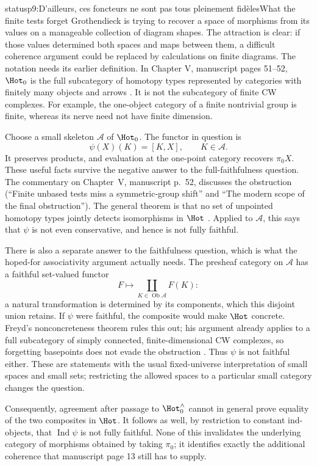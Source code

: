 \begin{dcomment}{status}{p9:D'ailleurs, ces foncteurs ne sont pas tous pleinement fidèles}{What the finite tests forget}
Grothendieck is trying to recover a space of morphisms from its values on a manageable collection of diagram shapes. The attraction is clear: if those values determined both spaces and maps between them, a difficult coherence argument could be replaced by calculations on finite diagrams. The notation needs its earlier definition. In Chapter V, manuscript pages 51--52, $\Hot_0$ is the full subcategory of homotopy types represented by categories with finitely many objects and arrows \citep[Chapter V, printed pp.~31--32]{GrothendieckDerivateursV}. It is not the subcategory of finite CW complexes. For example, the one-object category of a finite nontrivial group is finite, whereas its nerve need not have finite dimension.

Choose a small skeleton $\mathcal A$ of $\Hot_0$. The functor in question is
\[
 \psi(X)(K)=[K,X],\qquad K\in\mathcal A.
\]
It preserves products, and evaluation at the one-point category recovers $\pi_0X$. These useful facts survive the negative answer to the full-faithfulness question. The commentary on Chapter~V, manuscript p.~52, discusses the obstruction (``Finite unbased tests miss a symmetric-group shift'' and ``The modern scope of the final obstruction''). The general theorem is that no set of unpointed homotopy types jointly detects isomorphisms in $\Hot$ \citep[Theorem~2.1]{ArlinChristensen2023}. Applied to $\mathcal A$, this says that $\psi$ is not even conservative, and hence is not fully faithful.

There is also a separate answer to the faithfulness question, which is what the hoped-for associativity argument actually needs. The presheaf category on $\mathcal A$ has a faithful set-valued functor
\[
 F\longmapsto\coprod_{K\in\operatorname{Ob}\mathcal A}F(K):
\]
a natural transformation is determined by its components, which this disjoint union retains. If $\psi$ were faithful, the composite would make $\Hot$ concrete. Freyd's nonconcreteness theorem rules this out; his argument already applies to a full subcategory of simply connected, finite-dimensional CW complexes, so forgetting basepoints does not evade the obstruction \citep[pp.~1 and 5 of the 2004 reprint]{Freyd1970}. Thus $\psi$ is not faithful either. These are statements with the usual fixed-universe interpretation of small spaces and small sets; restricting the allowed spaces to a particular small category changes the question.

Consequently, agreement after passage to $\Hot_0^{\wedge}$ cannot in general prove equality of the two composites in $\Hot$. It follows as well, by restriction to constant ind-objects, that $\operatorname{Ind}\psi$ is not fully faithful. None of this invalidates the underlying category of morphisms obtained by taking $\pi_0$; it identifies exactly the additional coherence that manuscript page 13 still has to supply.
\end{dcomment}

